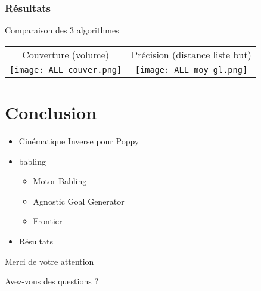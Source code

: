\documentclass[french]{beamer}
\begin{document}

\begin{frame}
    \frametitle{Résultats}

    Comparaison des 3 algorithmes
    \vfill

    \begin{tabular}{c c}
        Couverture (volume) & Précision (distance liste but)
        \\
        \texttt{[image: ALL\_couver.png]} &
        \texttt{[image: ALL\_moy\_gl.png]}
    \end{tabular}
\end{frame}

\section{Conclusion}

\begin{frame}

    \begin{itemize}
        \item Cinématique Inverse pour Poppy
        \item babling
        \begin{itemize}
            \item Motor Babling
            \item Agnostic Goal Generator
            \item Frontier
        \end{itemize}
        \item Résultats
    \end{itemize}
\end{frame}

\begin{frame}
    \center
    \Huge Merci de votre attention
    
    Avez-vous des questions ?
\end{frame}
\end{document}

